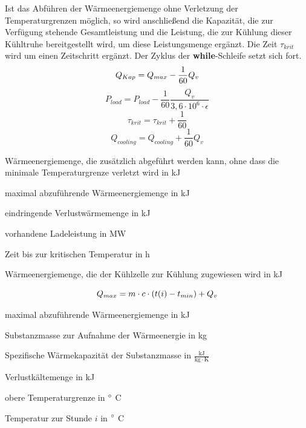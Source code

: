 \begin{description}
Ist das Abf\"uhren der W\"armeenergiemenge ohne Verletzung der Temperaturgrenzen
m\"oglich, so wird anschlie\ss end die Kapazit\"at, die zur Verf\"ugung
stehende Gesamtleistung und die Leistung, die zur K\"uhlung dieser K\"uhltruhe
bereitgestellt wird, um diese Leistungsmenge erg\"anzt. Die Zeit $\tau_{krit}$
wird um einen Zeitschritt erg\"anzt. Der Zyklus der \textbf{while}-Schleife
setzt sich fort.
\begin{equation}
	Q_{Kap} = Q_{max} - \frac{1}{60}Q_v\\
	\label{eq:ap}
\end{equation}
\begin{equation*}
	P_{load} = P_{load} - \frac{1}{60}\frac{Q_v }{3,6 \cdot 10^{6} \cdot
	\epsilon}
\end{equation*}
\begin{equation*}
	\tau_{krit} = \tau_{krit} + \frac{1}{60}
\end{equation*}
\begin{equation*}
	Q_{cooling} = Q_{cooling} + \frac{1}{60}Q_v
\end{equation*}
\begin{description}[\dth]
\item[$Q_{Kap}$] W\"armeenergiemenge, die zus\"atzlich abgef\"uhrt werden kann,
ohne dass die minimale Temperaturgrenze verletzt wird in kJ
\item[$Q_{max}$] maximal abzuf\"uhrende W\"armeenergiemenge in kJ
\item[$Q_{v}$] eindringende Verlustw\"armemenge in kJ
\item[$P_{load}$] vorhandene Ladeleistung in MW
\item[$\tau_{krit}$] Zeit bis zur kritischen Temperatur in h
\item[$Q_{cooling}$] W\"armeenergiemenge, die der K\"uhlzelle zur K\"uhlung
zugewiesen wird in kJ
\end{description} \vspace{0.5cm}
\begin{equation}
	\emax = m \cdot c \cdot (t(i) - t_{min}) + Q_v
\label{emax}
\end{equation}

\begin{description}[\dth]

	\item[$\emax$] maximal abzuf\"uhrende W\"armeenergiemenge in kJ
	\item[$m$] Substanzmasse zur Aufnahme der Wärmeenergie in kg
	\item[$c$] Spezifische Wärmekapazität der Substanzmasse in $\mathrm{\frac{kJ}{kg
		\cdot K}}$
	\item[$Q_v$] Verlustk\"altemenge in kJ
	\item[$t_{min}$] obere Temperaturgrenze in  $^\circ$ C
	\item[$t(i)$] Temperatur zur Stunde $i$ in  $^\circ$ C

\end{description}
\vspace{0.5cm}

\end{description}

